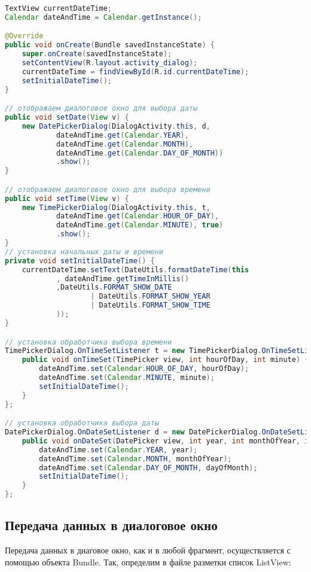\begin{lstlisting}[language=Java
	, label=lst:
	]
TextView currentDateTime;
Calendar dateAndTime = Calendar.getInstance();

@Override
public void onCreate(Bundle savedInstanceState) {
	super.onCreate(savedInstanceState);
	setContentView(R.layout.activity_dialog);
	currentDateTime = findViewById(R.id.currentDateTime);
	setInitialDateTime();
}

// отображаем диалоговое окно для выбора даты
public void setDate(View v) {
	new DatePickerDialog(DialogActivity.this, d,
			dateAndTime.get(Calendar.YEAR),
			dateAndTime.get(Calendar.MONTH),
			dateAndTime.get(Calendar.DAY_OF_MONTH))
			.show();
}

// отображаем диалоговое окно для выбора времени
public void setTime(View v) {
	new TimePickerDialog(DialogActivity.this, t,
			dateAndTime.get(Calendar.HOUR_OF_DAY),
			dateAndTime.get(Calendar.MINUTE), true)
			.show();
}
// установка начальных даты и времени
private void setInitialDateTime() {
	currentDateTime.setText(DateUtils.formatDateTime(this
			, dateAndTime.getTimeInMillis()
			,DateUtils.FORMAT_SHOW_DATE
					| DateUtils.FORMAT_SHOW_YEAR
					| DateUtils.FORMAT_SHOW_TIME
			));
}

// установка обработчика выбора времени
TimePickerDialog.OnTimeSetListener t = new TimePickerDialog.OnTimeSetListener() {
	public void onTimeSet(TimePicker view, int hourOfDay, int minute) {
		dateAndTime.set(Calendar.HOUR_OF_DAY, hourOfDay);
		dateAndTime.set(Calendar.MINUTE, minute);
		setInitialDateTime();
	}
};

// установка обработчика выбора даты
DatePickerDialog.OnDateSetListener d = new DatePickerDialog.OnDateSetListener() {
	public void onDateSet(DatePicker view, int year, int monthOfYear, int dayOfMonth) {
		dateAndTime.set(Calendar.YEAR, year);
		dateAndTime.set(Calendar.MONTH, monthOfYear);
		dateAndTime.set(Calendar.DAY_OF_MONTH, dayOfMonth);
		setInitialDateTime();
	}
};
\end{lstlisting}

\subsection{Передача данных в диалоговое окно}
Передача данных в диаговое окно, как и в любой фрагмент, осуществляется с
помощью объекта Bundle.
Так, определим в файле разметки список ListView:

